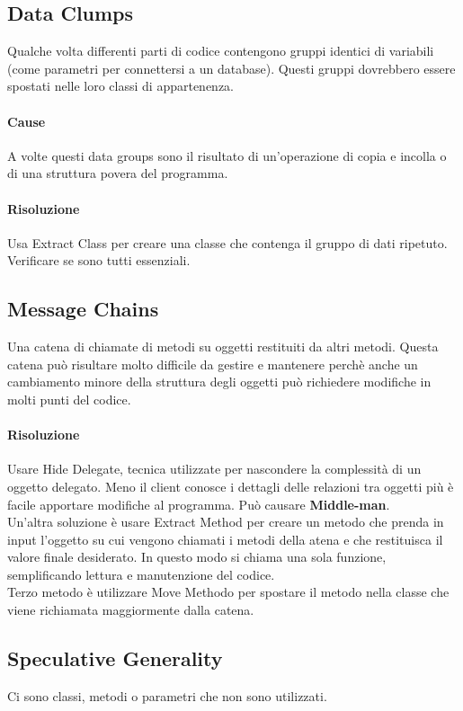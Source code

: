 \subsection{Data Clumps}
Qualche volta differenti parti di codice contengono gruppi identici di variabili (come parametri
per connettersi a un database). Questi gruppi dovrebbero essere spostati nelle loro classi di
appartenenza.
\paragraph*{Cause} A volte questi data groups sono il risultato di un'operazione di copia e incolla 
o di una struttura povera del programma.
\paragraph*{Risoluzione} Usa Extract Class per creare una classe che contenga il gruppo di dati ripetuto.
Verificare se sono tutti essenziali.
\subsection{Message Chains}
Una catena di chiamate di metodi su oggetti restituiti da altri metodi. Questa catena
può risultare molto difficile da gestire e mantenere perchè anche un cambiamento minore
della struttura degli oggetti può richiedere modifiche in molti punti del codice.
\paragraph*{Risoluzione} Usare Hide Delegate, tecnica utilizzate per nascondere
la complessità di un oggetto delegato. Meno il client conosce i dettagli delle relazioni
tra oggetti più è facile apportare modifiche al programma. Può causare \textbf{Middle-man}.\\
Un'altra soluzione è usare Extract Method per creare un metodo che prenda in input l'oggetto su
cui vengono chiamati i metodi della atena e che restituisca il valore finale desiderato. In questo
modo si chiama una sola funzione, semplificando lettura e manutenzione del codice.\\
Terzo metodo è utilizzare Move Methodo per spostare il metodo nella classe che viene
richiamata maggiormente dalla catena.
\subsection{Speculative Generality}
Ci sono classi, metodi o parametri che non sono utilizzati.
